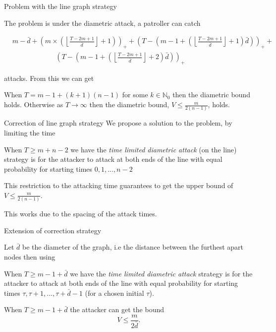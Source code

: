 \documentclass[11pt]{beamer}
\newcommand{\floor}[1]{\left \lfloor #1 \right \rfloor}
\newcommand{\pospart}[1]{\left( #1 \right)_{+}}
\begin{document}
\begin{frame}{Problem with the line graph strategy}

The problem is under the diametric attack, a patroller can catch
\tiny

\begin{align*}
&m-\bar{d}+\pospart{m \times (\floor{\frac{T-2m+1}{\bar{d}}}+1)} +  \pospart{T-(m-1+(\floor{\frac{T-2m+1}{\bar{d}}}+1)\bar{d})} +  \\
&\hspace{75pt} \pospart{T-(m-1+(\floor{\frac{T-2m+1}{\bar{d}}}+2)\bar{d})}
\end{align*}

\normalsize
attacks. From this we can get

\begin{lemma}
When $T=m-1+(k+1)(n-1)$ for some $k \in \mathbb{N}_{0}$ then the diametric bound holds. Otherwise as $T \rightarrow \infty$ then the diametric bound, $V \leq \frac{m}{2(n-1)}$, holds.
\end{lemma}

\end{frame}

\hypertarget{Correction to Line graph strategy}{}
\begin{frame}{Correction of line graph strategy}
We propose a solution to the problem, by limiting the time

\begin{definition}
When $T \geq m+n-2$ we have the \textit{time limited diametric attack} (on the line) strategy is for the attacker to attack at both ends of the line with equal probability for starting times $0,1,...,n-2$
\end{definition}

This restriction to the attacking time guarantees to get the upper bound of $V \leq \frac{m}{2(n-1)}$. 

This works due to the spacing of the attack times.
\end{frame}

\hypertarget{Extension of correction strategy}{}
\begin{frame}{Extension of correction strategy}


Let $\bar{d}$ be the diameter of the graph, i.e the distance between the furthest apart nodes then using

\begin{definition}
When $T \geq m-1+\bar{d}$ we have the \textit{time limited diametric attack} strategy is for the attacker to attack at both ends of the line with equal probability for starting times $\tau,\tau +1,...,\tau + \bar{d}-1$ (for a chosen initial $\tau$).
\end{definition}

\begin{lemma}
When $T \geq m-1 +\bar{d}$ the attacker can get the bound
$$V \leq \dfrac{m}{2\bar{d}}.$$
\end{lemma}

\end{frame}
\end{document}
